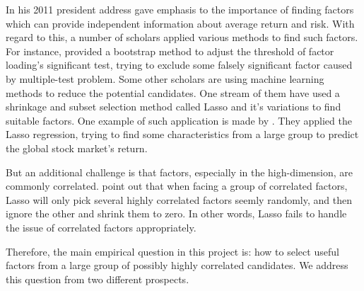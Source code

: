 In his 2011 president address \citeauthor{Cochrane2011} gave emphasis to the importance of finding factors which can provide independent information about average return and risk.
With regard to this, a number of scholars applied various methods to find such factors. 
For instance,  provided a bootstrap method to adjust the threshold of factor loading's significant test, trying to exclude some falsely significant factor caused by multiple-test problem.
Some other scholars are using machine learning methods to reduce the potential candidates. 
One stream of them have used a shrinkage and subset selection method called Lasso \cite{Tibshirani1996} and it's variations to find suitable factors.
One example of such application is made by .
They applied the Lasso regression, trying to find some characteristics from a large group to predict the global stock market's return.

But an additional challenge is that factors, especially in the high-dimension, are commonly correlated.
 point out that when facing a group of correlated factors, Lasso will only pick several highly correlated factors seemly randomly, and then ignore the other and shrink them to zero. 
In other words, Lasso fails to handle the issue of correlated factors appropriately.





Therefore, the main empirical question in this project is: how to select useful factors from a large group of possibly highly correlated candidates.
We address this question from two different prospects.

